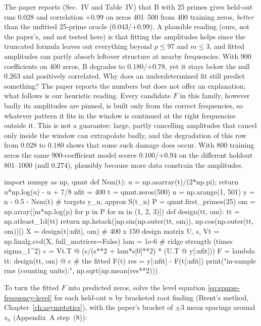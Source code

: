 The paper reports (Sec.~IV and Table~IV) that B with 25 primes gives held-out rms $0.028$ and correlation $+0.99$ on zeros 401--500 from 400 training zeros, \emph{better} than the unfitted 25-prime oracle ($0.043$/$+0.99$). A plausible reading (ours, not the paper's, and not tested here) is that fitting the amplitudes helps since the truncated formula leaves out everything beyond $p\le97$ and $m\le3$, and fitted amplitudes can partly absorb leftover structure at nearby frequencies. With 900 coefficients on 400 zeros, B degrades to $0.180$/$+0.78$, yet it stays below the null $0.263$ and positively correlated. Why does an underdetermined fit still predict something? The paper reports the numbers but does not offer an explanation; what follows is our heuristic reading. Every candidate $F$ in this family, however badly its amplitudes are pinned, is built only from the correct frequencies, so whatever pattern it fits in the window is continued at the right frequencies outside it. This is not a guarantee: large, partly cancelling amplitudes that cancel only inside the window can extrapolate badly, and the degradation of this row from $0.028$ to $0.180$ shows that some such damage does occur. With 800 training zeros the same 900-coefficient model scores $0.100$/$+0.94$ on the different holdout 801--1000 (null $0.274$), plausibly because more data constrain the amplitudes.

\begin{pycode}
import numpy as np, qmnt
def Nsm(t):
    u = np.asarray(t)/(2*np.pi); return u*np.log(u) - u + 7/8
nfit = 400
t = qmnt.zeros(500)
n = np.arange(1, 501)
y = n - 0.5 - Nsm(t)                      # targets y_n, approx S(t_n)
P = qmnt.first_primes(25)
om = np.array([m*np.log(p) for p in P for m in (1, 2, 3)])
def design(tt, om):
    tt = np.atleast_1d(tt)
    return np.hstack([np.sin(np.outer(tt, om)), np.cos(np.outer(tt, om))])
X = design(t[:nfit], om)                  # 400 x 150 design matrix
U, s, Vt = np.linalg.svd(X, full_matrices=False)
lam = 1e-6                                # ridge strength (times sigma_1^2)
c = Vt.T @ (s/(s**2 + lam*s[0]**2) * (U.T @ y[:nfit]))
F = lambda tt: design(tt, om) @ c         # the fitted F(t)
res = y[:nfit] - F(t[:nfit])
print("in-sample rms (counting units):", np.sqrt(np.mean(res**2)))
\end{pycode}

To turn the fitted $F$ into predicted zeros, solve the level equation \eqref{eq:sparse-frequency-level} for each held-out $n$ by bracketed root finding (Brent's method, Chapter~\ref{ch:asymptotics}), with the paper's bracket of $\pm3$ mean spacings around $s_n$ (Appendix~A step~(8)):

